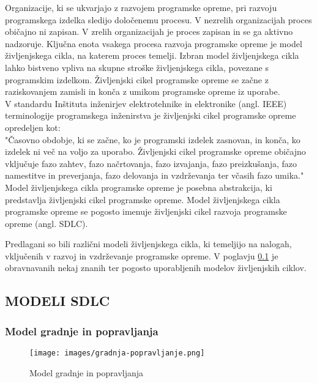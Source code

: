 \documentclass[a4paper,12pt,openright]{book}
\begin{document}
Organizacije, ki se ukvarjajo z razvojem programske opreme, pri razvoju programskega izdelka sledijo določenemu procesu. V nezrelih organizacijah proces običajno ni zapisan. V zrelih organizacijah je proces zapisan in se ga aktivno nadzoruje. Ključna enota vsakega procesa razvoja programske opreme je model življenjskega cikla, na katerem proces temelji. Izbran model življenjskega cikla lahko bistveno vpliva na skupne stroške življenjskega cikla, povezane s programskim izdelkom. Življenjski cikel programske opreme se začne z raziskovanjem zamisli in konča z umikom programske opreme iz uporabe. \\
V standardu Inštituta inženirjev elektrotehnike in elektronike (angl. IEEE) terminologije programskega inženirstva je življenjski cikel programske opreme opredeljen kot: \\
"Časovno obdobje, ki se začne, ko je programski izdelek zasnovan, in konča, ko izdelek ni več na voljo za uporabo. Življenjski cikel programske opreme običajno vključuje fazo zahtev, fazo načrtovanja, fazo izvajanja, fazo preizkušanja, fazo namestitve in preverjanja, fazo delovanja in vzdrževanja ter včasih fazo umika." \\
Model življenjskega cikla programske opreme je posebna abstrakcija, ki predstavlja življenjski cikel programske opreme. Model življenjskega cikla programske opreme se pogosto imenuje življenjski cikel razvoja programske opreme (angl. SDLC). \cite{aggarwal2005software}


Predlagani so bili različni modeli življenjskega cikla, ki temeljijo na nalogah, vključenih v razvoj in vzdrževanje programske opreme. V poglavju \ref{chap:SDLC} je obravnavanih nekaj znanih ter pogosto uporabljenih modelov življenjskih ciklov.
\subsection{MODELI SDLC} \label{chap:SDLC}
\subsubsection{Model gradnje in popravljanja}
\begin{figure}[H]
    \centering
    \texttt{[image: images/gradnja-popravljanje.png]}
    \caption{Model gradnje in popravljanja}
    \label{fig:gradnja}
\end{figure}
\end{document}
